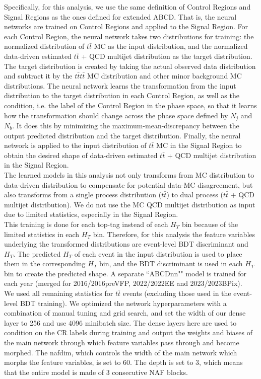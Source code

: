 \documentclass[twoside]{article}
\begin{document}
Specifically, for this analysis, we use the same definition of Control Regions and Signal Regions as the ones defined for extended ABCD. That is, the neural networks are trained on Control Regions and applied to the Signal Region. For each Control Region, the neural network takes two distributions for training: the normalized distribution of $t\bar{t}$ MC as the input distribution, and the normalized data-driven estimated $t\bar{t}$ + QCD multijet distribution as the target distribution. The target distribution is created by taking the actual observed data distribution and subtract it by the $t\bar{t}t\bar{t}$ MC distribution and other minor background MC distributions. The neural network learns the transformation from the input distribution to the target distribution in each Control Region, as well as the condition, i.e. the label of the Control Region in the phase space, so that it learns how the transformation should change across the phase space defined by $N_j$ and $N_b$. It does this by minimizing the maximum-mean-discrepancy between the output predicted distribution and the target distribution. Finally, the neural network is applied to the input distribution of $t\bar{t}$ MC in the Signal Region to obtain the desired shape of data-driven estimated $t\bar{t}$ + QCD multijet distribution in the Signal Region.\\

The learned models in this analysis not only transforms from MC distribution to data-driven distribution to compensate for potential data-MC disagreement, but also transforms from a single process distribution ($t\bar{t}$) to dual process ($t\bar{t}$ + QCD multijet distribution). We do not use the MC QCD multijet distribution as input due to limited statistics, especially in the Signal Region.\\

This training is done for each top-tag instead of each $H_T$ bin because of the limited statistics in each $H_T$ bin. Therefore, for this analysis the feature variables underlying the transformed distributions are event-level BDT discriminant and $H_T$. The predicted $H_T$ of each event in the input distribution is used to place them in the corresponding $H_T$ bin, and the BDT discriminant is used in each $H_T$ bin to create the predicted shape. A separate ``ABCDnn"" model is trained for each year (merged for 2016/2016preVFP, 2022/2022EE and 2023/2023BPix).\\

We used all remaining statistics for $t\bar{t}$ events (excluding those used in the event-level BDT training). We optimized the network hyperparameters with a combination of manual tuning and grid search, and set the width of our dense layer to 256 and use 4096 minibatch size. The dense layers here are used to condition on the CR labels during training and output the weights and biases of the main network through which feature variables pass through and become morphed. The nafdim, which controls the width of the main network which morphs the feature variables, is set to 60. The depth is set to 3, which means that the entire model is made of 3 consecutive NAF blocks.\\
\end{document}
